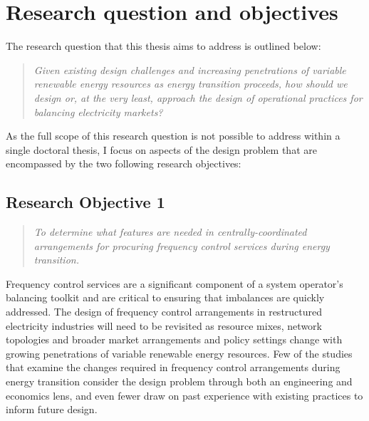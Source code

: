 \documentclass[12pt,a4paper,]{report}
\begin{document}
\hypertarget{research-question-and-objectives}{%
\section{Research question and
objectives}\label{research-question-and-objectives}}

The research question that this thesis aims to address is outlined
below:

\begin{quote}
\emph{Given existing design challenges and increasing penetrations of
variable renewable energy resources as energy transition proceeds, how
should we design or, at the very least, approach the design of
operational practices for balancing electricity markets?}
\end{quote}

As the full scope of this research question is not possible to address
within a single doctoral thesis, I focus on aspects of the design
problem that are encompassed by the two following research objectives:

\hypertarget{research-objective-1}{%
\subsection{Research Objective 1}\label{research-objective-1}}

\begin{quote}
\emph{To determine what features are needed in centrally-coordinated
arrangements for procuring frequency control services during energy
transition.}
\end{quote}

Frequency control services are a significant component of a system
operator's balancing toolkit and are critical to ensuring that
imbalances are quickly addressed. The design of frequency control
arrangements in restructured electricity industries will need to be
revisited as resource mixes, network topologies and broader market
arrangements and policy settings change with growing penetrations of
variable renewable energy resources. Few of the studies that examine the
changes required in frequency control arrangements during energy
transition consider the design problem through both an engineering and
economics lens, and even fewer draw on past experience with existing
practices to inform future design.
\end{document}
